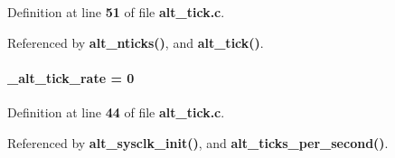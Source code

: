 Definition at line {\bf 51} of file {\bf alt\+\_\+tick.\+c}.



Referenced by {\bf alt\+\_\+nticks()}, and {\bf alt\+\_\+tick()}.

\paragraph[{\+\_\+alt\+\_\+tick\+\_\+rate}]{ \+\_\+alt\+\_\+tick\+\_\+rate = 0}\label{alt__tick_8c_abbfc6eca4ab60b513c03b9aee1e07533}


Definition at line {\bf 44} of file {\bf alt\+\_\+tick.\+c}.



Referenced by {\bf alt\+\_\+sysclk\+\_\+init()}, and {\bf alt\+\_\+ticks\+\_\+per\+\_\+second()}.

